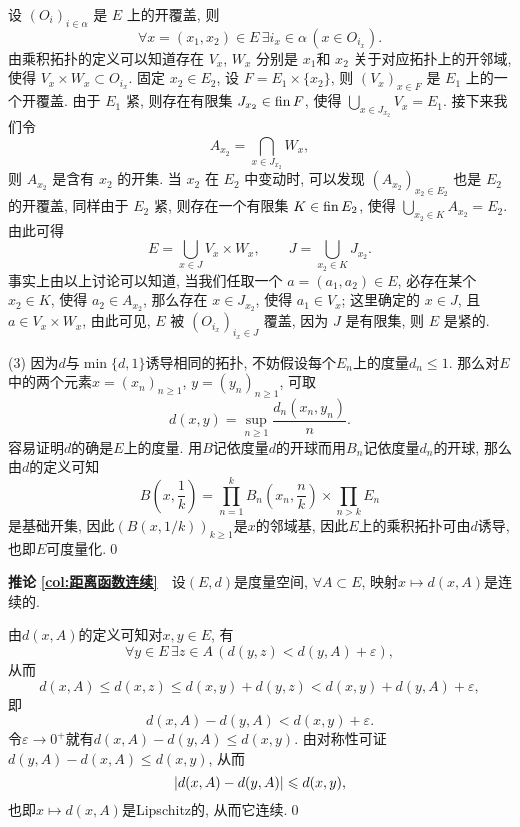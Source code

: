 \begin{appendix}
\begin{Proof}
	设 $ (O_{i})_{i\in\alpha} $ 是 $ E $ 上的开覆盖, 则
	\[
		\forall x=(x_{1}, x_{2})\in E\,\exists i_{x}\in\alpha\,(x\in O_{i_{x}}).
	\]
	由乘积拓扑的定义可以知道存在 $ V_{x} $, $ W_{x} $ 分别是 $ x_{1} $和 $ x_{2} $ 关于对应拓扑上的开邻域, 使得 $ V_{x}\times W_{x}\subset O_{i_{x}} $. 固定 $ x_{2}\in E_{2} $, 设 $ F=E_{1}\times \{ x_{2} \} $, 则 $ (V_{x})_{x\in F} $ 是 $ E_{1} $ 上的一个开覆盖. 由于 $ E_{1} $ 紧, 则存在有限集 $ J_{x_{2}}\in \operatorname{fin} F $, 使得 $ \bigcup_{x\in J_{x_{2}}}V_{x}=E_{1} $. 接下来我们令
	\[
		A_{x_{2}}=\bigcap_{x\in J_{x_{2}}}W_{x},
	\]
	则 $ A_{x_{2}} $ 是含有 $ x_{2} $ 的开集. 当 $ x_{2} $ 在 $ E_{2} $ 中变动时, 可以发现 $ (A_{x_{2}})_{x_{2}\in E_{2}} $ 也是 $ E_{2} $ 的开覆盖, 同样由于 $ E_{2} $ 紧, 则存在一个有限集 $ K\in\operatorname{fin} E_{2} $, 使得 $ \bigcup_{x_{2}\in K}A_{x_{2}}=E_{2} $. 由此可得
	\[
		E=\bigcup_{x\in J} V_{x}\times W_{x},\qquad J=\bigcup_{x_{2}\in K}J_{x_{2}}.
	\]
	事实上由以上讨论可以知道, 当我们任取一个 $ a=(a_{1}, a_{2})\in E $, 必存在某个 $ x_{2}\in K $, 使得 $ a_{2}\in A_{x_{2}} $, 那么存在 $ x\in J_{x_{2}} $, 使得 $ a_{1}\in V_{x} $; 这里确定的 $ x\in J $, 且 $ a\in V_{x}\times W_{x} $, 由此可见,  $ E $ 被 $ (O_{i_{x}})_{i_{x}\in J} $ 覆盖, 因为 $ J $ 是有限集, 则 $ E $ 是紧的.
	
	(3) 因为$ d $与$ \min\{d,1\} $诱导相同的拓扑, 不妨假设每个$ E_n $上的度量$ d_n\leqslant 1 $. 那么对$ E $中的两个元素$ x=(x_n)_{n\geqslant 1} $, $ y=(y_n)_{n\geqslant 1} $, 可取
	\[
	d(x,y)=\sup_{n\geqslant 1}\frac{d_n(x_n,y_n)}{n}.
	\]
	容易证明$ d $的确是$ E $上的度量. 用$ B $记依度量$ d $的开球而用$ B_n $记依度量$ d_n $的开球, 那么由$ d $的定义可知
	\[
	B\left(x,\frac{1}{k}\right)=\prod_{n=1}^kB_n\left(x_n,\frac{n}{k}\right)\times\prod_{n>k}E_n
	\]
	是基础开集, 因此$ (B(x,1/k))_{k\geqslant 1} $是$ x $的邻域基, 因此$ E $上的乘积拓扑可由$ d $诱导, 也即$ E $可度量化.\qed
	     
	\end{Proof}
	
	\textbf{推论\,\,\ref{col:距离函数连续}}\ \ 设$ (E,d) $是度量空间, $ \forall A\subset E $, 映射$ x\mapsto d(x,A) $是连续的.
	\begin{Proof}
	由$ d(x,A) $的定义可知对$ x,y\in E $, 有
	\[
	\forall y\in E\,\exists z\in A\,(d(y,z)<d(y,A)+\varepsilon),
	\]
	从而
	\[
	d(x,A)\leqslant d(x,z)\leqslant d(x,y)+d(y,z)<d(x,y)+d(y,A)+\varepsilon,
	\]
	即
	\[
	d(x,A)-d(y,A)<d(x,y)+\varepsilon.
	\]
	令$ \varepsilon\to 0^+ $就有$ d(x,A)-d(y,A)\leqslant d(x,y) $. 由对称性可证$ d(y,A)-d(x,A)\leqslant d(x,y) $, 从而
	\[
	\left| d(x,A)-d(y,A) \right| \leqslant d(x,y),
	\]
	也即$ x\mapsto d(x,A) $是Lipschitz的, 从而它连续.\qed
	\end{Proof}
	

\end{appendix}
